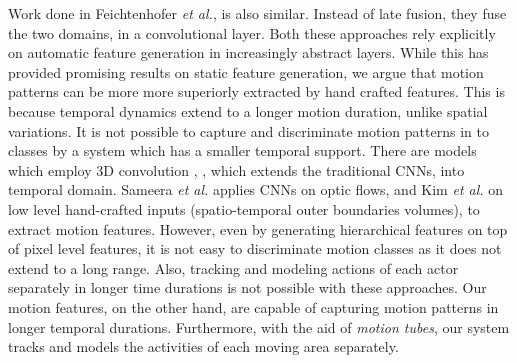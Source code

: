 Work done in Feichtenhofer \textit{et al.}\cite{feichtenhofer2016convolutional}, is also similar. Instead of late fusion, 
they fuse the two domains, in a convolutional layer. Both these approaches rely explicitly on automatic feature 
generation in increasingly abstract layers. While this has provided promising results on static feature generation,
we argue that motion patterns can be more more superiorly extracted by hand crafted features. This is because
temporal dynamics extend to a longer motion duration, unlike spatial variations. It is not possible 
to capture and discriminate motion patterns in to classes by a system which has a smaller temporal support. There are models
which employ 3D convolution \cite{ji20133d}, \cite{tran2015learning}, which extends the traditional CNNs, into temporal domain. 
Sameera \textit{et al.}\cite{7486474} applies CNNs on optic flows, and Kim \textit{et al.}\cite{kim2007human} on low level hand-crafted inputs 
(spatio-temporal outer boundaries volumes), to extract motion features. However, even by generating hierarchical 
features on top of pixel level features, it is not easy to discriminate motion classes as it does not extend to a long range. 
Also, tracking and modeling actions of each actor separately in longer time durations is not possible with these 
approaches. Our motion features, on the other hand, are capable of capturing motion patterns in longer temporal durations.
Furthermore, with the aid of \textit{motion tubes}, our system tracks and models the activities of each moving area separately. 

